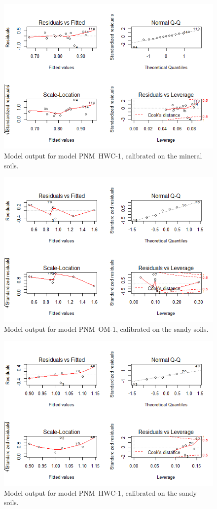 \documentclass[10pt,twoside,dutch,english]{report}
\begin{document}
\begin{appendices}
\begin{figure}[H]
		\includegraphics[width=0.85\linewidth]{appendix_modout_min_hw}
		\caption{Model output for model  PNM~HWC-1, calibrated on the mineral soils.}
		\end{figure}
		\begin{figure}[H] %
    	\centering
		\includegraphics[width=0.85\linewidth]{appendix_modout_sand_om}
		\caption{Model output for model  PNM~OM-1, calibrated on the sandy soils.}
		\end{figure}
		\begin{figure}[H] %
    	\centering
		\includegraphics[width=0.85\linewidth]{appendix_modout_sand_hw}
		\caption{Model output for model  PNM~HWC-1, calibrated on the sandy soils.}
		\end{figure}
	


\end{appendices}
\end{document}
